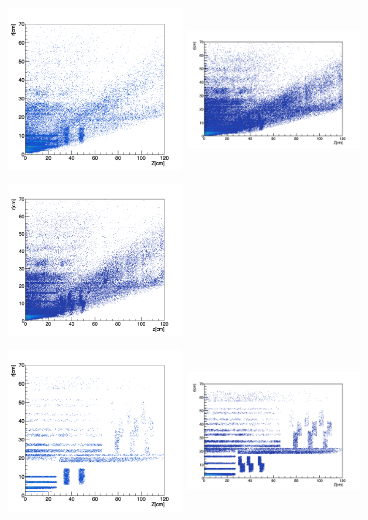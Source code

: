 \documentclass{cernatlasnote}
\begin{document}
  
\begin{figure}[htp]
\centering
\includegraphics[width=4.6cm, height=4.4cm]{images/emu_channel/2016/16_2D_plots/SecInt16_selec_zr.png}
\includegraphics[width=4.6cm, height=4.4cm]{images/emu_channel/2017/17_2D_plots/SecInt17_sel_zr.png}
 \includegraphics[width=4.6cm, height=4.4cm]{images/emu_channel/2018/18_2D_plots/SecInt_z_r_sel.png}\\
 \includegraphics[width=4.6cm, height=4.4cm]{images/emu_channel/2016/16_2D_plots/SecInt16_tracker_match_zr.png}
\includegraphics[width=4.6cm, height=4.4cm]{images/emu_channel/2017/17_2D_plots/SecInt17_trackermatch_zr.png}

\end{figure}
\end{document}

